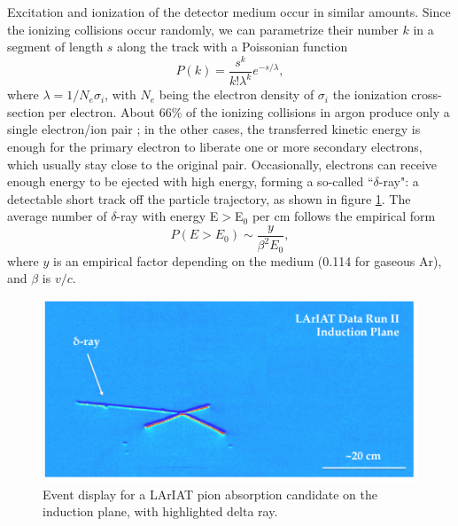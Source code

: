 Excitation and ionization of the detector medium occur in similar amounts. Since the ionizing collisions occur randomly, we can parametrize their number $k$ in a segment of length $s$ along the track  with a Poissonian function
\begin{equation}
P(k) = \frac{s^k}{k! \lambda^k} e^{-s/ \lambda }, 
\end{equation}
where $\lambda = 1/N_{e}\sigma_i$, with $N_{e}$ being the electron density of $\sigma_i$ the ionization cross-section per electron.  About 66\% of the ionizing collisions in argon produce only a single electron/ion pair \cite{0034-4885-73-11-116201}; in the other cases, the transferred kinetic energy is enough for the primary electron to liberate one or more secondary electrons, which usually stay close to the original pair.  
Occasionally, electrons can receive enough energy to be ejected with high energy, forming a so-called ``$\delta$-ray": a detectable  short track off the particle trajectory, as shown in figure \ref{fig:delta}. 
The average number of $\delta$-ray  with energy E$>$E$_0$ per cm follows the empirical form
\begin{equation}
P(E>E_0) \sim \frac{y}{\beta^2 E_0},
\end{equation}
where $y$ is an empirical factor depending on the medium (0.114 for  gaseous Ar), and $\beta$ is $v/c$.

\begin{figure}[hbpt]
\centering
\includegraphics[width=\textwidth]{Chapter-2/Images/Delta.png}
\caption{Event display for a LArIAT pion absorption candidate on the induction plane, with highlighted delta ray.}
\label{fig:delta}
\end{figure}


		
